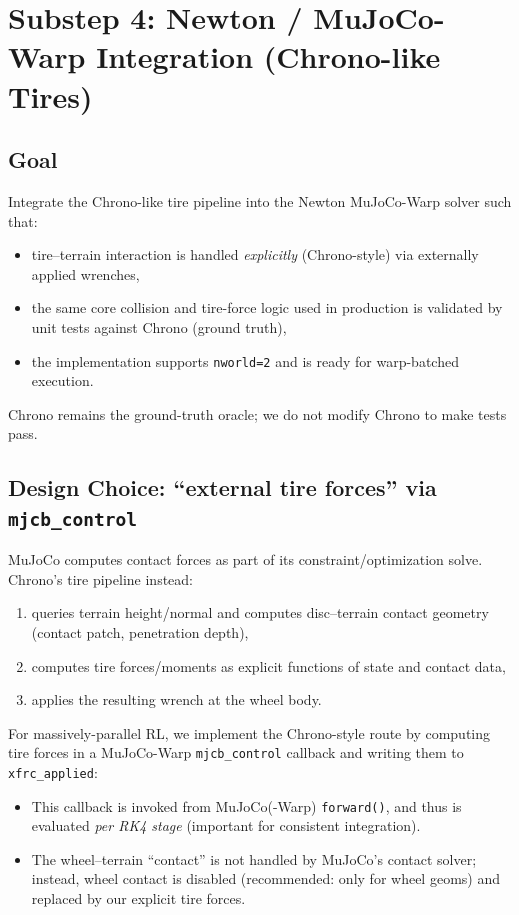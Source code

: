 %
%
\section{Substep 4: Newton / MuJoCo-Warp Integration (Chrono-like Tires)}
\label{sec:substep4-mujoco-integration}

\subsection{Goal}
Integrate the Chrono-like tire pipeline into the Newton MuJoCo-Warp solver such that:
\begin{itemize}
  \item tire--terrain interaction is handled \emph{explicitly} (Chrono-style) via externally applied wrenches,
  \item the same core collision and tire-force logic used in production is validated by unit tests against Chrono (ground truth),
  \item the implementation supports \texttt{nworld=2} and is ready for warp-batched execution.
\end{itemize}
Chrono remains the ground-truth oracle; we do not modify Chrono to make tests pass.

\subsection{Design Choice: ``external tire forces'' via \texttt{mjcb\_control}}
\label{sec:substep4-design-choice}
MuJoCo computes contact forces as part of its constraint/optimization solve. Chrono's tire pipeline instead:
\begin{enumerate}
  \item queries terrain height/normal and computes disc--terrain contact geometry (contact patch, penetration depth),
  \item computes tire forces/moments as explicit functions of state and contact data,
  \item applies the resulting wrench at the wheel body.
\end{enumerate}

For massively-parallel RL, we implement the Chrono-style route by computing tire forces in a MuJoCo-Warp
\texttt{mjcb\_control} callback and writing them to \texttt{xfrc\_applied}:
\begin{itemize}
  \item This callback is invoked from MuJoCo(-Warp) \texttt{forward()}, and thus is evaluated \emph{per RK4 stage}
        (important for consistent integration).
  \item The wheel--terrain ``contact'' is not handled by MuJoCo's contact solver; instead, wheel contact is disabled
        (recommended: only for wheel geoms) and replaced by our explicit tire forces.
\end{itemize}

